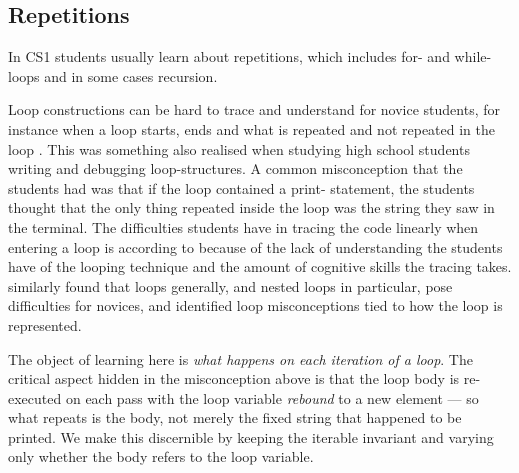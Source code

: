 \mode*
\subsection{Repetitions}

In CS1 students usually learn about repetitions, which includes for- and 
while-loops and in some cases recursion.

Loop constructions can be hard to trace and understand for novice students, 
for instance when a loop starts, ends and what is repeated and not repeated 
in the loop \autocite{Sekiya2013,KumarVeerasamy2016,Kaczmarczyk2010}. This 
was something \textcite{Sleeman1984} also realised when studying high 
school students writing and debugging loop-structures. A common 
misconception that the students had was that if the loop contained a print-
statement, the students thought that the only thing repeated inside the 
loop was the string they saw in the terminal. The difficulties students 
have in tracing the code linearly when entering a loop is according to
\textcite{KumarVeerasamy2016} because of the lack of understanding the
students have of the looping technique and the amount of cognitive skills
the tracing takes. \textcite{Eckert2022Loops} similarly found that loops
generally, and nested loops in particular, pose difficulties for novices, and
identified loop misconceptions tied to how the loop is represented.

The object of learning here is \emph{what happens on each iteration of a loop}.
The critical aspect hidden in the misconception above is that the loop body is
re-executed on each pass with the loop variable \emph{rebound} to a new element
--- so what repeats is the body, not merely the fixed string that happened to be
printed. We make this discernible by keeping the iterable invariant and varying
only whether the body refers to the loop variable.

